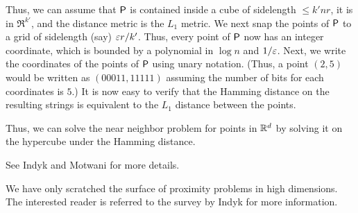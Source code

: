 Thus, we can assume that ${\mathsf{P}}$ is contained inside a cube of
sidelength $\leq k'nr$, it is in $\Re^{k'}$, and the distance metric
is the $L_1$ metric. We next snap the points of ${\mathsf{P}}$ to a grid of
sidelength (say) ${\varepsilon} r/k'$. Thus, every point of ${\mathsf{P}}$ now has
an integer coordinate, which is bounded by a polynomial in $\log n$
and $1/{\varepsilon}$. Next, we write the coordinates of the points of
${\mathsf{P}}$ using unary notation. (Thus, a point $(2,5)$ would be
written as $(00011,11111)$ assuming the number of bits for each
coordinates is $5$.) It is now easy to verify that the Hamming
distance on the resulting strings is equivalent to the $L_1$ distance
between the points.

Thus, we can solve the near neighbor problem for points in $\mathbb{R}^d$
by solving it on the hypercube under the Hamming distance.

See Indyk and Motwani \cite{im-anntr-98} for more details.

\bigskip

We have only scratched the surface of proximity problems in high
dimensions. The interested reader is referred to the survey by Indyk
\cite{a-rs-04} for more information.




\ChapterEnd{}

%
